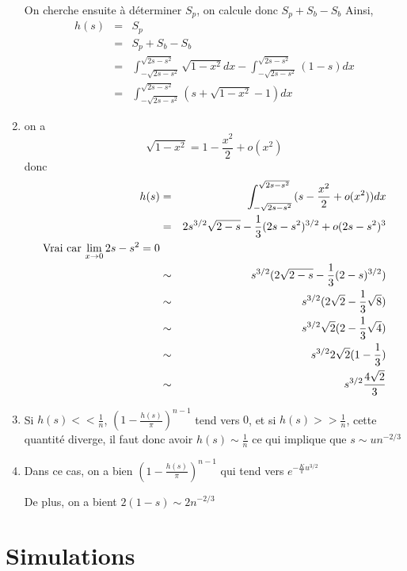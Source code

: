 \documentclass[a4paper,12pt,twoside]{article}
\begin{document}
\begin{enumerate}
			On cherche ensuite à déterminer $S_p$, on calcule donc $S_p + S_b - S_b$
			Ainsi, \begin{eqnarray}
				h(s)	&=& S_p \\
					&=& S_p + S_b - S_b \\
					&=& \int^{\sqrt{2s - s^2}}_{-\sqrt{2s - s^2}}{\sqrt{1-x^2}dx} - \int^{\sqrt{2s - s^2}}_{-\sqrt{2s - s^2}}{(1 - s) dx} \\
					&=& \int^{\sqrt{2s - s^2}}_{-\sqrt{2s - s^2}}{(s + \sqrt{1-x^2} - 1) dx}
			\end{eqnarray}

		\item on a $$\sqrt{1 - x^2} = 1 - \frac{x^2}{2} + o(x^2)$$
		donc
		\begin{eqnarray}
			h(s)	&=& \int^{\sqrt{2s - s^2}}_{-\sqrt{2s - s^2}}{(s - \frac{x^2}{2} + o(x^2)) dx} \\
				&=& 2s^{3/2}\sqrt{2-s} - \frac{1}{3}(2s - s^2)^{3/2} + o(2s-s^2)^3 \\\text{Vrai car $ \lim_{x \to 0} 2s - s^2 = 0$}\\ %
				&\sim& s^{3/2} (2\sqrt{2-s} - \frac{1}{3}(2 - s)^{3/2}) \\
				&\sim& s^{3/2} (2\sqrt{2} - \frac{1}{3}\sqrt{8}) \\
				&\sim& s^{3/2} \sqrt{2}(2 - \frac{1}{3}\sqrt{4}) \\
				&\sim& s^{3/2} 2\sqrt{2}(1 - \frac{1}{3}) \\
				&\sim& s^{3/2} \frac{4\sqrt{2}}{3} \\
		\end{eqnarray}
		\item	Si $h(s) << \frac{1}{n}$, $\left(1 - \frac{h(s)}{\pi}\right)^{n-1}$ tend vers $0$, et si $h(s) >> \frac{1}{n}$, cette quantité diverge, il faut donc avoir $h(s) \sim \frac{1}{n}$ ce qui implique que $s \sim un^{-2/3}$%

		\item Dans ce cas, on a bien $\left(1 - \frac{h(s)}{\pi}\right)^{n-1}$ qui tend vers $e^{-\frac{K}{\pi}u^{3/2}}$

		De plus, on a bient $2(1-s) \sim 2n^{-2/3}$

		\end{enumerate}

\section{Simulations}
\end{document}
